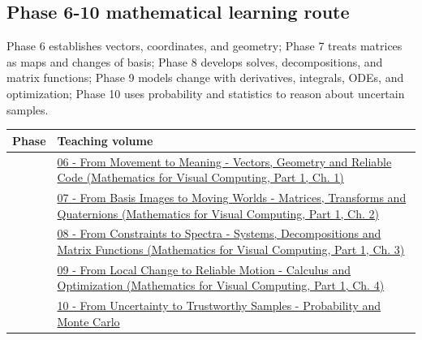 \subsection{Phase 6-10 mathematical learning route}\label{appendix-4ad47bdd269a-phase-6-10-mathematical-learning-route}

\hypertarget{appendix-4ad47bdd269a-phase-6-10-mathematical-learning-route}{}

Phase 6 establishes vectors, coordinates, and geometry; Phase 7 treats matrices as maps and changes of basis; Phase 8 develops solves, decompositions, and matrix functions; Phase 9 models change with derivatives, integrals, ODEs, and optimization; Phase 10 uses probability and statistics to reason about uncertain samples.

{\def\LTcaptype{none} %
\begin{longtable}[]{@{}
  >{\raggedright\arraybackslash}p{}
  >{\raggedright\arraybackslash}p{}@{}}
\toprule\noalign{}
\begin{minipage}[b]{\linewidth}\raggedright
Phase
\end{minipage} & \begin{minipage}[b]{\linewidth}\raggedright
Teaching volume
\end{minipage} \\
\midrule\noalign{}
\endhead
\bottomrule\noalign{}
\endlastfoot
6 & \href{../02-Mathematics-for-Visual-Computing-P01/main.pdf\#nameddest=01-foundations-i-ch017-the-panel-gives-us-a-reason-to-learn}{06 - From Movement to Meaning - Vectors, Geometry and Reliable Code (Mathematics for Visual Computing, Part 1, Ch. 1)} \\
7 & \href{../02-Mathematics-for-Visual-Computing-P01/main.pdf\#nameddest=01-foundations-i-ch018-keep-the-promises-visible-while-moving-between-representations}{07 - From Basis Images to Moving Worlds - Matrices, Transforms and Quaternions (Mathematics for Visual Computing, Part 1, Ch. 2)} \\
8 & \href{../02-Mathematics-for-Visual-Computing-P01/main.pdf\#nameddest=01-foundations-i-ch019-the-graphics-problem-hiding-inside-a-matrix-equation}{08 - From Constraints to Spectra - Systems, Decompositions and Matrix Functions (Mathematics for Visual Computing, Part 1, Ch. 3)} \\
9 & \href{../02-Mathematics-for-Visual-Computing-P01/main.pdf\#nameddest=01-foundations-i-ch020-functions-limits-continuity-and-scalar-change}{09 - From Local Change to Reliable Motion - Calculus and Optimization (Mathematics for Visual Computing, Part 1, Ch. 4)} \\
10 & \hyperref[02-foundations-ii-ch039-learning-route]{10 - From Uncertainty to Trustworthy Samples - Probability and Monte Carlo} \\
\end{longtable}
}

